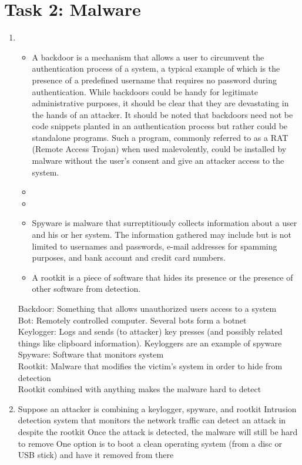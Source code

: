 \section*{Task 2: Malware}
\begin{enumerate}
\item %
  \begin{itemize}
  \item A backdoor is a mechanism that allows a user to circumvent the authentication process of a system, a typical example of which is the presence of a predefined username that requires no password during authentication. While backdoors could be handy for legitimate administrative purposes, it should be clear that they are devastating in the hands of an attacker. It should be noted that backdoors need not be code snippets planted in an authentication process but rather could be standalone programs. Such a program, commonly referred to as a RAT (Remote Access Trojan) when used malevolently, could be installed by malware without the user's consent and give an attacker access to the system.\cite{aycock06}
  \item
  \item
  \item
    Spyware is malware that surreptitiously collects information about a user and his or her system. The information gathered may include but is not limited to usernames and passwords, e-mail addresses for spamming purposes, and bank account and credit card numbers.\cite{aycock06}
  \item A rootkit is a piece of software that hides its presence or the presence of other software from detection. 
  \end{itemize}
  Backdoor: Something that allows unauthorized users access to a system\\
  Bot: Remotely controlled computer. Several bots form a botnet\\
  Keylogger: Logs and sends (to attacker) key presses (and possibly related things like clipboard information). Keyloggers are an example of spyware\\
  Spyware: Software that monitors system\\
  Rootkit: Malware that modifies the victim's system in order to hide from detection\\

  Rootkit combined with anything makes the malware hard to detect
\item %
  Suppose an attacker is combining a keylogger, spyware, and rootkit
Intrusion detection system that monitors the network traffic can detect an attack in despite the rootkit
Once the attack is detected, the malware will still be hard to remove
One option is to boot a clean operating system (from a disc or USB stick) and have it removed from there
  
\end{enumerate}
